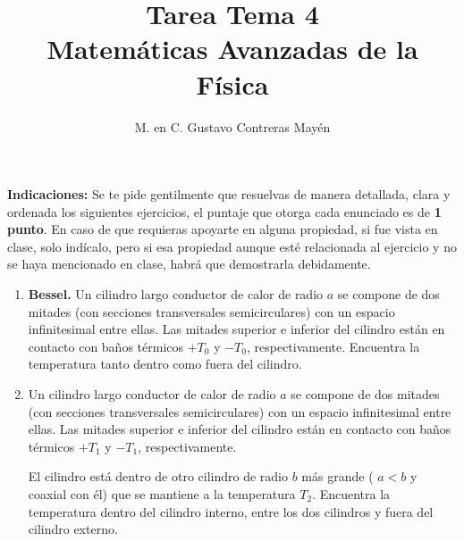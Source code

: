 \documentclass[hidelinks,12pt]{article}
\title{Tarea Tema 4 \\[0.3em] \large{Matemáticas Avanzadas de la Física}\vspace{-3ex}}
\author{M. en C. Gustavo Contreras Mayén}
\date{ }
\begin{document}
\vspace{-4cm}
\maketitle

\fontsize{14}{14}\selectfont

\textbf{Indicaciones: } Se te pide gentilmente que resuelvas de manera detallada, clara y ordenada los siguientes ejercicios, el puntaje que otorga cada enunciado es de \textbf{1 punto}. En caso de que requieras apoyarte en alguna propiedad, si fue vista en clase, solo indícalo, pero si esa propiedad aunque esté relacionada al ejercicio y no se haya mencionado en clase, habrá que demostrarla debidamente.

\begin{enumerate}
\item \textbf{Bessel. }Un cilindro largo conductor de calor de radio $a$ se compone de dos mitades (con secciones transversales semicirculares) con un espacio infinitesimal entre ellas. Las mitades superior e inferior del cilindro están en contacto con baños térmicos $+T_{0}$ y $-T_{0}$, respectivamente. Encuentra la temperatura tanto dentro como fuera del cilindro.
\item Un cilindro largo conductor de calor de radio $a$ se compone de dos mitades (con secciones transversales semicirculares) con un espacio infinitesimal entre ellas. Las mitades superior e inferior del cilindro están en contacto con baños térmicos $+T_{1}$ y $-T_{1}$, respectivamente.
\par 
El cilindro está dentro de otro cilindro de radio $b$ más grande ( $a < b$ y coaxial con él) que se mantiene a la temperatura $T_{2}$. Encuentra la temperatura dentro del cilindro interno, entre los dos cilindros y fuera del cilindro externo.

\newpage


\end{enumerate}
\end{document}
